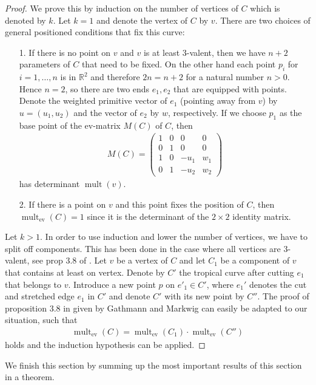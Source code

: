 \documentclass[11pt,reqno,a4]{amsart}
\theoremstyle{dotless}
\theoremstyle{definition}
\newcommand{\mult}{\operatorname{mult}}
\newcommand{\ev}{\operatorname{ev}}
\begin{document}
\begin{proof}
We prove this by induction on the number of vertices of $C$ which is denoted by $k$. Let $k=1$ and denote the vertex of $C$ by $v$.
 There are two choices of general positioned conditions that fix this curve:
\begin{itemize}
\item[1.]
If there is no point on $v$ and $v$ is at least $3$-valent, then we have $n+2$ parameters of $C$ that need to be fixed. On the other hand each point $p_i$ for $i=1,\dots,n$ is in $\mathbb{R}^2$ and therefore $2n=n+2$ for a natural number $n>0$. Hence $n=2$, so there are two ends $e_1,e_2$ that are equipped with points. Denote the weighted primitive vector of $e_1$ (pointing away from $v$) by $u=\left(u_1,u_2\right)$ and the vector of $e_2$ by $w$, respectively. If we choose $p_1$ as the base point of the ev-matrix $M(C)$ of $C$, then
\begin{align*}
M(C)=
\left(
\begin{array}{cccc}
1&0&0&0\\
0&1&0&0\\
1&0&-u_1&w_1\\
0&1&-u_2&w_2
\end{array}
\right)
\end{align*}
has determinant $\mult(v)$.
\item[2.]
If there is a point on $v$ and this point fixes the position of $C$, then
$\mult_{\ev}(C)=1$ since it is the determinant of the $2\times 2$ identity matrix.
\end{itemize}
Let $k> 1$. In order to use induction and lower the number of vertices, we have to split off components. This has been done in the case where all vertices are $3$-valent, see prop 3.8 of \cite{KontsevichPaper}. Let $v$ be a vertex of $C$ and let $C_1$ be a component of $v$ that contains at least on vertex. Denote by $C'$ the tropical curve after cutting $e_1$ that belongs to $v$. Introduce a new point $p$ on $e'_1\in C'$, where $e_1'$ denotes the cut and stretched edge $e_1$ in $C'$ and denote $C'$ with its new point by $C''$. The proof of proposition 3.8 in \cite{KontsevichPaper} given by Gathmann and Markwig can easily be adapted to our situation, such that
\begin{align*}
\mult_{\ev}(C)=\mult_{\ev}(C_1)\cdot \mult_{\ev}(C'')
\end{align*}
holds and the induction hypothesis can be applied.
\end{proof}

We finish this section by summing up the most important results of this section in a theorem.
\end{document}
